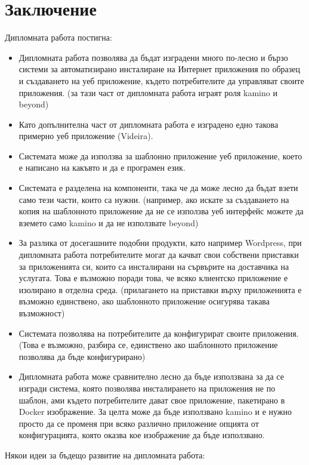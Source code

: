 \documentclass[pdftex,14pt,a4paper]{extreport}
\begin{document}
\chapter*{Заключение}
Дипломната работа постигна:
\begin{itemize}
  \item Дипломната работа позволява да бъдат изградени много по-лесно и бързо системи за автоматизирано инсталиране на Интернет приложения по образец и създаването на уеб приложение, където потребителите да управляват своите приложения. (за тази част от дипломната работа играят роля kamino и beyond)
  \item Като допълнителна част от дипломната работа е изградено едно такова примерно уеб приложение (Videira).
  \item Системата може да използва за шаблонно приложение уеб приложение, което е написано на какъвто и да е програмен език.
  \item Системата е разделена на компоненти, така че да може лесно да бъдат взети само тези части, които са нужни. (например, ако искате за създаването на копия на шаблонното приложение да не се използва уеб интерфейс можете да вземето само kamino и да не използвате beyond)
  \item За разлика от досегашните подобни продукти, като например Wordpress, при дипломната работа потребителите могат да качват свои собствени приставки за приложенията си, които са инсталирани на сървърите на доставчика на услугата. Това е възможно поради това, че всяко клиентско приложение е изолирано в отделна среда. (прилагането на приставки върху приложенията е възможно единствено, ако шаблонното приложение осигурява такава възможност)
  \item Системата позволява на потребителите да конфигурират своите приложения. (Това е възможно, разбира се, единствено ако шаблонното приложение позволява да бъде конфигурирано)
  \item Дипломната работа може сравнително лесно да бъде използвана за да се изгради система, която позволява инсталирането на приложения не по шаблон, ами където потребителите дават свое приложение, пакетирано в Docker изображение. За целта може да бъде използвано kamino и е нужно просто да се променя при всяко различно приложение опцията от конфигурацията, която оказва кое изображение да бъде използвано.
\end{itemize}
Някои идеи за бъдещо развитие на дипломната работа:
\end{document}
